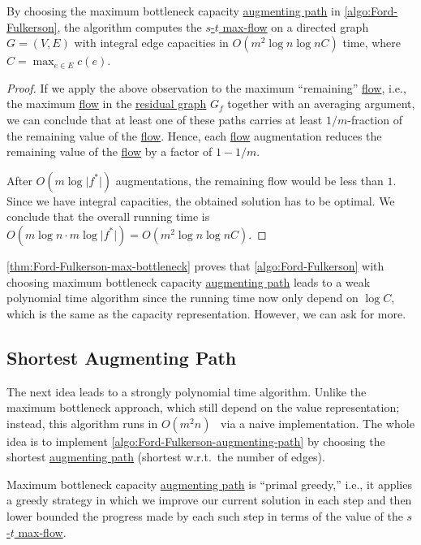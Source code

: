 \begin{theorem}\label{thm:Ford-Fulkerson-max-bottleneck}
	By choosing the maximum bottleneck capacity \hyperref[def:augmenting-path]{augmenting path} in \autoref{algo:Ford-Fulkerson}, the algorithm computes the \hyperref[prb:s-t-max-flow]{\(s\)-\(t\) max-flow} on a directed graph \(G = (V, E)\) with integral edge capacities in \(O(m^2 \log n \log nC)\) time, where \(C = \max _{e \in E} c(e)\).
\end{theorem}
\begin{proof}
	If we apply the above observation to the maximum ``remaining'' \hyperref[def:flow]{flow}, i.e., the maximum \hyperref[def:flow]{flow} in the \hyperref[def:residual-graph]{residual graph} \(G_f\) together with an averaging argument, we can conclude that at least one of these paths carries at least \(1 / m\)-fraction of the remaining value of the \hyperref[def:flow]{flow}. Hence, each \hyperref[def:flow]{flow} augmentation reduces the remaining value of the \hyperref[def:flow]{flow} by a factor of \(1 - 1 / m\).

	After \(O(m \log \lvert f^{\ast} \rvert )\) augmentations, the remaining flow would be less than \(1\). Since we have integral capacities, the obtained solution has to be optimal. We conclude that the overall running time is \(O(m \log n \cdot m \log \lvert f^{\ast} \rvert ) = O(m^2 \log n \log nC)\).
\end{proof}

\autoref{thm:Ford-Fulkerson-max-bottleneck} proves that \autoref{algo:Ford-Fulkerson} with choosing maximum bottleneck capacity \hyperref[def:augmenting-path]{augmenting path} leads to a weak polynomial time algorithm since the running time now only depend on \(\log C\), which is the same as the capacity representation. However, we can ask for more.

\subsection{Shortest Augmenting Path}
The next idea leads to a strongly polynomial time algorithm. Unlike the maximum bottleneck approach, which still depend on the value representation; instead, this algorithm runs in \(O(m^2 n)\)~\cite{edmonds1972theoretical} via a naive implementation. The whole idea is to implement \autoref{algo:Ford-Fulkerson-augmenting-path} by choosing the shortest \hyperref[def:augmenting-path]{augmenting path} (shortest w.r.t.\ the number of edges).

\begin{prev}
	Maximum bottleneck capacity \hyperref[def:augmenting-path]{augmenting path} is ``primal greedy,'' i.e., it applies a greedy strategy in which we improve our current solution in each step and then lower bounded the progress made by each such step in terms of the value of the \hyperref[prb:s-t-max-flow]{\(s\)-\(t\) max-flow}.
\end{prev}

